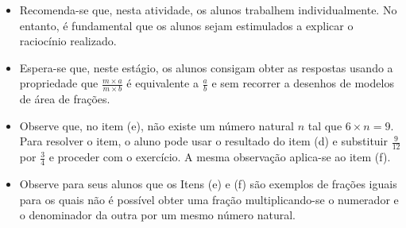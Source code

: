 \begin{multicols}{2}
\begin{orientacoes}
\begin{itemize} %
    \item       Recomenda-se que, nesta atividade, os alunos trabalhem
individualmente. No entanto, é fundamental que os alunos sejam estimulados a
explicar o raciocínio realizado.
    \item       Espera-se que, neste estágio, os alunos consigam obter as
respostas usando a propriedade que       $\frac{m \times a}{m \times b}$       é
equivalente a       $\frac{a}{b}$       e sem recorrer a desenhos de modelos de
área de frações.
    \item       Observe que, no item (e), não existe um número natural       $n$
      tal que       $6 \times n = 9$. Para resolver o item, o aluno pode usar o
resultado do item (d) e substituir       $\frac{9}{12}$       por
$\frac{3}{4}$       e proceder com o exercício. A mesma observação aplica-se ao
item (f).
    \item       Observe para seus alunos que os Itens (e) e (f) são exemplos de
frações iguais para os quais não é possível obter uma fração multiplicando-se o
numerador e o denominador da outra por um mesmo número natural.
\end{itemize} %




\end{orientacoes}


\end{multicols}
